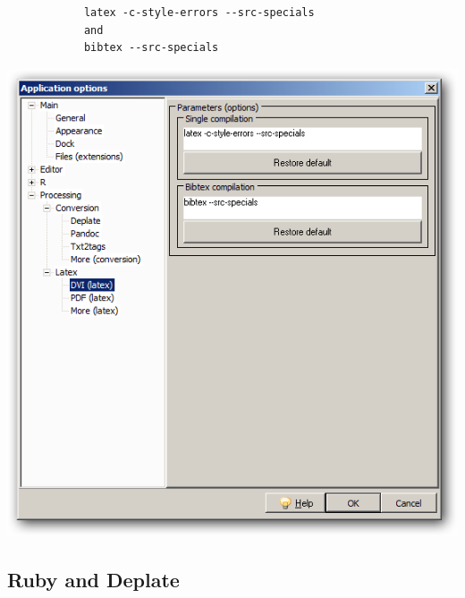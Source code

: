 \begin{itemize}
\begin{itemize}
        \begin{footnotesize}
          \begin{verbatim}
            latex -c-style-errors --src-specials
            and
            bibtex --src-specials
          \end{verbatim}
        \end{footnotesize}

        \includegraphics[scale=0.50]{./res/app_processing_latex_dvi.png}\\
    \end{itemize}
\end{itemize}


\subsection{Ruby and Deplate}

